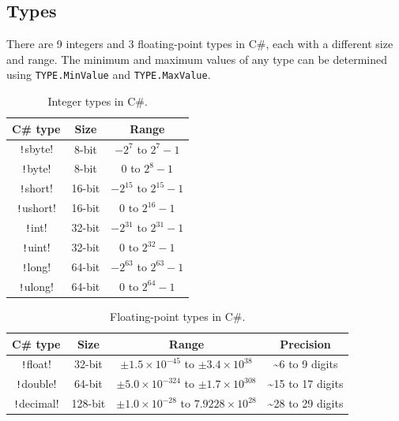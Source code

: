 \documentclass{article}
\begin{document}
\subsection{Types}
There are 9 integers and 3 floating-point types in C\#, each with a
different size and range. The minimum and maximum values of any type
can be determined using \texttt{TYPE.MinValue} and
\linebreak \texttt{TYPE.MaxValue}.
\begin{table}[H]
    \centering
    \begin{tabular}{c c c}
        \toprule
        \textbf{C\# type}           & \textbf{Size} & \textbf{Range}                \\
        \midrule
        \texttt!sbyte!  & 8-bit         & \(-2^7\) to \(2^7 - 1\)       \\
        \texttt!byte!   & 8-bit         & \(0\) to \(2^8 - 1\)          \\
        \texttt!short!  & 16-bit        & \(-2^{15}\) to \(2^{15} - 1\) \\
        \texttt!ushort! & 16-bit        & \(0\) to \(2^{16} - 1\)       \\
        \texttt!int!    & 32-bit        & \(-2^{31}\) to \(2^{31} - 1\) \\
        \texttt!uint!   & 32-bit        & \(0\) to \(2^{32} - 1\)       \\
        \texttt!long!   & 64-bit        & \(-2^{63}\) to \(2^{63} - 1\) \\
        \texttt!ulong!  & 64-bit        & \(0\) to \(2^{64} - 1\)       \\
        \bottomrule
    \end{tabular}
    \caption{Integer types in C\#.}
\end{table}
\begin{table}[H]
    \centering
    \begin{tabular}{c c c c}
        \toprule
        \textbf{C\# type}            & \textbf{Size} & \textbf{Range}                                              & \textbf{Precision}   \\
        \midrule
        \texttt!float!   & 32-bit        & \(\pm 1.5 \times 10^{-45}\) to \(\pm 3.4 \times 10^{38}\)   & \sim 6 to 9 digits   \\
        \texttt!double!  & 64-bit        & \(\pm 5.0 \times 10^{-324}\) to \(\pm 1.7 \times 10^{308}\) & \sim 15 to 17 digits \\
        \texttt!decimal! & 128-bit       & \(\pm 1.0 \times 10^{-28}\) to \(7.9228 \times 10^{28}\)    & \sim 28 to 29 digits \\
        \bottomrule
    \end{tabular}
    \caption{Floating-point types in C\#.}
\end{table}
\end{document}
